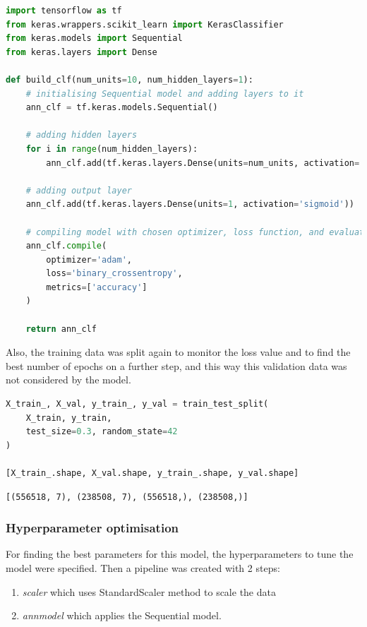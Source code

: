\documentclass{article}
\begin{document}
\begin{lstlisting}[language=Python]
import tensorflow as tf
from keras.wrappers.scikit_learn import KerasClassifier
from keras.models import Sequential
from keras.layers import Dense

def build_clf(num_units=10, num_hidden_layers=1):
    # initialising Sequential model and adding layers to it
    ann_clf = tf.keras.models.Sequential()
    
    # adding hidden layers
    for i in range(num_hidden_layers):
        ann_clf.add(tf.keras.layers.Dense(units=num_units, activation='relu'))

    # adding output layer
    ann_clf.add(tf.keras.layers.Dense(units=1, activation='sigmoid'))
    
    # compiling model with chosen optimizer, loss function, and evaluation metrics
    ann_clf.compile(
        optimizer='adam',
        loss='binary_crossentropy',
        metrics=['accuracy']
    )
    
    return ann_clf
\end{lstlisting}

Also, the training data was split again to monitor the loss value and to find the best number of epochs on a further step, and this way this validation data was not considered by the model.

\begin{lstlisting}[language=Python]
X_train_, X_val, y_train_, y_val = train_test_split(
    X_train, y_train, 
    test_size=0.3, random_state=42
)

[X_train_.shape, X_val.shape, y_train_.shape, y_val.shape]
\end{lstlisting}
\begin{verbatim}
[(556518, 7), (238508, 7), (556518,), (238508,)]
\end{verbatim}

\subsubsection{Hyperparameter optimisation}
For finding the best parameters for this model, the hyperparameters to tune the model were specified. Then a pipeline was created with 2 steps:
\begin{enumerate}
\item \emph{scaler} which uses StandardScaler method to scale the data
\item \emph{annmodel} which applies the Sequential model.
\end{enumerate}
\end{document}
